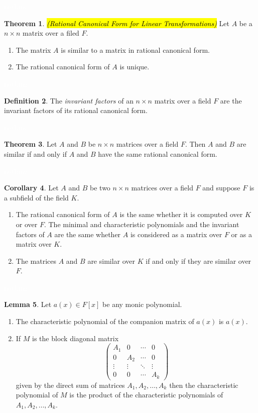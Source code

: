 \documentclass{article}
\theoremstyle{definition}
\newtheorem{thm}{Theorem}[section]
\newtheorem{lem}[thm]{Lemma}
\newtheorem{cor}[thm]{Corollary}
\newtheorem{defn}[thm]{Definition}
\newcommand{\nl}{\textcolor{white}{nothing}}
\begin{document}
\nl

\begin{thm}\hl{\textit{(Rational Canonical Form for Linear Transformations)}}
Let $A$ be a $n\times n$ matrix over a filed $F$.
\begin{enumerate}
\item The matrix $A$ is similar to a matrix in rational canonical form.
\item The rational canonical form of $A$ is unique.
\end{enumerate}
\end{thm}

\nl

\begin{defn}
The \textit{invariant factors} of an $n\times n$ matrix over a field $F$ are the invariant factors of its rational canonical form.
\end{defn}

\nl

\begin{thm}
Let $A$ and $B$ be $n\times n$ matrices over a field $F$. Then $A$ and $B$ are similar if and only if $A$ and $B$ have the same rational canonical form.
\end{thm}

\nl

\begin{cor}
Let $A$ and $B$ be two $n\times n$ matrices over a field $F$ and suppose $F$ is a subfield of the field $K$.
\begin{enumerate}
\item The rational canonical form of $A$ is the same whether it is computed over $K$ or over $F$. The minimal and characteristic polynomials and the invariant factors of $A$ are the same whether $A$ is considered as a matrix over $F$ or as a matrix over $K$.
\item The matrices $A$ and $B$ are similar over $K$ if and only if they are similar over $F$.
\end{enumerate}
\end{cor}

\nl

\begin{lem}
Let $a(x)\in F[x]$ be any monic polynomial.
\begin{enumerate}
\item The characteristic polynomial of the companion matrix of $a(x)$ is $a(x)$.
\item If $M$ is the block diagonal matrix
\[\begin{pmatrix}
A_1 & 0 & \cdots & 0\\
0 & A_2 & \cdots & 0\\
\vdots & \vdots & \ddots & \vdots\\
0 & 0 & \cdots & A_k
\end{pmatrix}\]
given by the direct sum of matrices $A_1, A_2, \ldots, A_k$ then the characteristic polynomial of $M$ is the product of the characteristic polynomials of $A_1, A_2, \ldots, A_k$.
\end{enumerate}
\end{lem}
\end{document}
